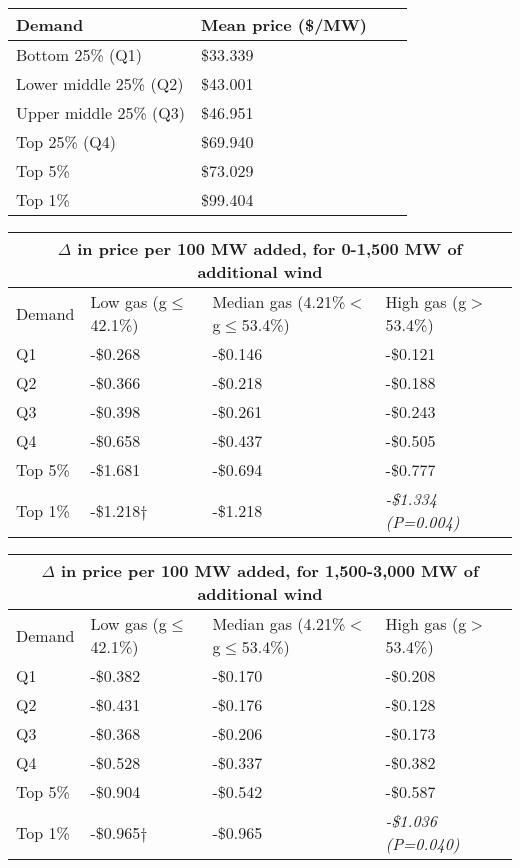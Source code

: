 \documentclass[11pt, oneside]{article}      %
\begin{document}
\begin{center}
\begin{tabular}{ |p{5cm}||p{5cm}|p{5cm}|p{5cm}|  }
 \hline
Demand & Mean price (\$/MW)\\
 \hline
Bottom 25\% (Q1) & \$33.339 \\
 \hline
Lower middle 25\% (Q2) & \$43.001 \\
 \hline
Upper middle 25\% (Q3) & \$46.951 \\
 \hline
Top 25\% (Q4) & \$69.940 \\
 \hline
Top 5\% & \$73.029 \\
 \hline
Top 1\% & \$99.404 \\
 \hline
\end{tabular}
\end{center}

 \begin{center}
\begin{tabular}{ |p{2.5cm}||p{3.4cm}|p{3.4cm}|p{3.4cm}|  }
 \hline
 \multicolumn{4}{|c|}{$\Delta$ in price per 100 MW added, for 0-1,500 MW of additional wind} \\
 \hline
Demand & Low gas (g$\leq$42.1\%) & Median gas (4.21\%$<$g$\leq$53.4\%) & High gas (g$>$53.4\%) \\
 \hline
Q1 & -\$0.268 & -\$0.146 & -\$0.121 \\
 \hline
Q2 & -\$0.366 & -\$0.218 & -\$0.188 \\
 \hline
Q3 & -\$0.398 & -\$0.261 & -\$0.243 \\
 \hline
Q4 & -\$0.658 & -\$0.437 & -\$0.505 \\
 \hline
Top 5\% & -\$1.681 & -\$0.694 & -\$0.777 \\
 \hline
Top 1\% & -\$1.218$\dagger$ & -\$1.218 & \it{-\$1.334 (P=0.004)} \\
 \hline
\end{tabular}
\end{center}

 \begin{center}
\begin{tabular}{ |p{2.5cm}||p{3.4cm}|p{3.4cm}|p{3.4cm}|  }
 \hline
 \multicolumn{4}{|c|}{$\Delta$ in price per 100 MW added, for 1,500-3,000 MW of additional wind} \\
 \hline
Demand & Low gas (g$\leq$42.1\%) & Median gas (4.21\%$<$g$\leq$53.4\%) & High gas (g$>$53.4\%) \\
 \hline
Q1 & -\$0.382 & -\$0.170 & -\$0.208 \\
 \hline
Q2 & -\$0.431 & -\$0.176 & -\$0.128 \\
 \hline
Q3 & -\$0.368 & -\$0.206 & -\$0.173 \\
 \hline
Q4 & -\$0.528 & -\$0.337 & -\$0.382 \\
 \hline
Top 5\% & -\$0.904 & -\$0.542 & -\$0.587 \\
 \hline
Top 1\% & -\$0.965$\dagger$ & -\$0.965 & \it{-\$1.036 (P=0.040)} \\
 \hline
\end{tabular}
\end{center}
\end{document}
